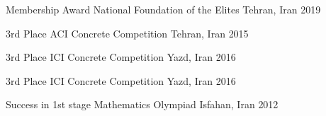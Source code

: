



\begin{cvhonors}


  \cvhonor
    {Membership Award} %
    {National Foundation of the Elites} %
    {Tehran, Iran} %
    {2019} %

  \cvhonor
    {3rd Place} %
    {ACI Concrete Competition} %
    {Tehran, Iran} %
    {2015} %
    
  \cvhonor
    {3rd Place} %
    {ICI Concrete Competition} %
    {Yazd, Iran} %
    {2016} %
    
  \cvhonor
    {3rd Place} %
    {ICI Concrete Competition} %
    {Yazd, Iran} %
    {2016} %
    
    
  \cvhonor
    {Success in 1st stage} %
    {Mathematics Olympiad} %
    {Isfahan, Iran} %
    {2012} %


\end{cvhonors}


    {} %
    {} %
    {} %
    {} %